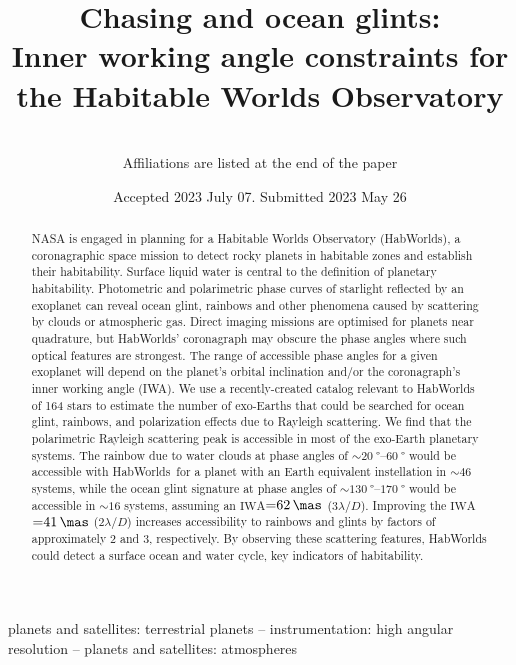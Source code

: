 \documentclass[usenatbib]{mnras}
\title{Chasing \rainbows and ocean glints:\\ Inner working angle constraints for the Habitable Worlds Observatory}
\author[Sophia R. Vaughan et al.]{%
    
    \newauthor 
    \\%
    Affiliations are listed at the end of the paper
}
\date{Accepted 2023 July 07. Submitted 2023 May 26}
\newcommand{\IWA}{\ensuremath{\mathrm{IWA}}\xspace}
\newcommand{\HWO}{HabWorlds\xspace}
\begin{document}
 

\maketitle

\begin{abstract}
NASA is engaged in planning for a Habitable Worlds Observatory (\HWO), a coronagraphic space mission to detect rocky planets in habitable zones and establish their habitability. 
%
Surface liquid water is central to the definition of planetary habitability.
%
Photometric and polarimetric phase curves of starlight reflected by an exoplanet can reveal ocean glint, rainbows and other phenomena caused by scattering by clouds or atmospheric gas.
%
Direct imaging missions are optimised for planets near quadrature, but \HWO' coronagraph may obscure the phase angles where such optical features are strongest. 
%
The range of accessible phase angles for a given exoplanet will depend on the planet's orbital inclination and/or the coronagraph's inner working angle (IWA). 
%
We use a recently-created catalog relevant to HabWorlds of 164 stars to estimate the number of exo-Earths that could be searched for ocean glint, rainbows, and polarization effects due to Rayleigh scattering. 
%
We find that the polarimetric Rayleigh scattering peak is accessible in most of the exo-Earth planetary systems.
%
The rainbow due to water clouds at phase angles of ${\sim}\qtyrange{20}{60}{\degree}$ would be accessible with \HWO\ for a planet with an Earth equivalent instellation in ${\sim}\num{46}$ systems, while the ocean glint signature at phase angles of ${\sim}\qtyrange{130}{170}{\degree}$ would be accessible in ${\sim}\num{16}$ systems, assuming an \IWA${=}\qty{62}{\mas}$ ($3\lambda/D$).
%
Improving the \IWA${=}\qty{41}{\mas}$ ($2\lambda/D$) increases accessibility to rainbows and glints by factors of approximately 2 and 3, respectively.
%
By observing these scattering features, \HWO could detect a surface ocean and water cycle, key indicators of habitability.
\end{abstract}

\begin{keywords}
    planets and satellites: terrestrial planets -- 
    instrumentation: high angular resolution -- 
    planets and satellites: atmospheres
\end{keywords}

\end{document}
